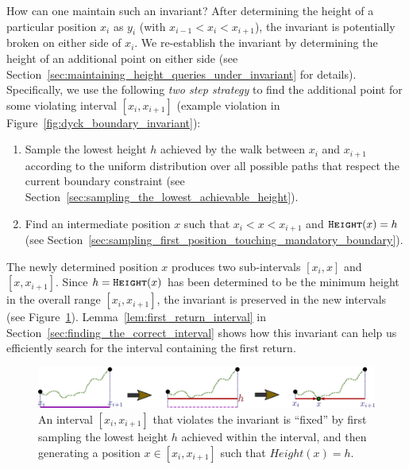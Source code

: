 How can one maintain such an invariant?
After determining the height of a particular position $x_i$ as $y_i$ (with $x_{i-1} < x_i < x_{i+1}$),
the invariant is potentially broken on either side of $x_i$.
We re-establish the invariant by determining the height of an additional point on either side
(see Section~\ref{sec:maintaining_height_queries_under_invariant} for details).
Specifically, we use the following \emph{two step strategy} to find the additional point for some violating interval $[x_i, x_{i+1}]$
(example violation in Figure~\ref{fig:dyck_boundary_invariant}):
\begin{enumerate}
    \item Sample the lowest height $h$ achieved by the walk between $x_i$ and $x_{i+1}$ according to
    the uniform distribution over all possible paths that respect the current boundary constraint
    (see Section~\ref{sec:sampling_the_lowest_achievable_height}).
    \item Find an intermediate position $x$ such that $x_i < x < x_{i+1}$ and $\texttt{\textsc{Height}}(x) = h$
    (see Section~\ref{sec:sampling_first_position_touching_mandatory_boundary}).
\end{enumerate}
The newly determined position $x$ produces two sub-intervals $[x_i, x]$ and $[x, x_{i+1}]$.
Since $h = \texttt{\textsc{Height}}(x)$ has been determined to be the minimum height in the overall range $[x_i, x_{i+1}]$,
the invariant is preserved in the new intervals (see Figure~\ref{fig:dyck_invariant_preserve}).
Lemma~\ref{lem:first_return_interval} in Section~\ref{sec:finding_the_correct_interval}
shows how this invariant can help us efficiently search for the interval containing the first return.
\begin{figure}[htpb]
    \centering
    \includegraphics[width=\textwidth]{images/dyck_invariant_preserve.pdf}
    \caption{An interval $[x_i, x_{i+1}]$ that violates the invariant is ``fixed'' by first sampling the lowest height $h$ achieved within the interval,
    and then generating a position $x\in [x_i, x_{i+1}]$ such that $Height(x) = h$.}
    \label{fig:dyck_invariant_preserve}
\end{figure}


